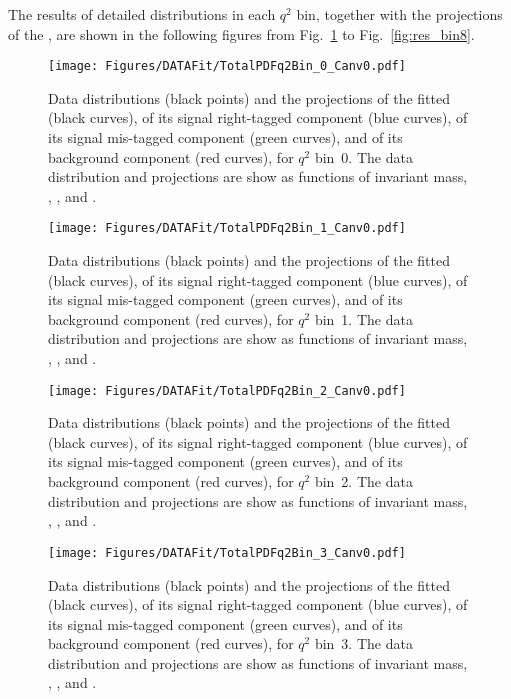 The results of detailed distributions in each $q^2$ bin, together with the projections of the \pdf, are shown in the following figures from Fig.~\ref{fig:res_bin0} to Fig.~\ref{fig:res_bin8}.

\begin{figure}
  \centering
  \texttt{[image: Figures/DATAFit/TotalPDFq2Bin\_0\_Canv0.pdf]}
  \caption{Data distributions (black points) and the projections of the fitted \pdf (black curves), of its signal right-tagged component (blue curves), of its signal mis-tagged component (green curves), and of its background component (red curves), for $q^2$ bin~0.
    The data distribution and \pdf projections are show as functions of \PBz invariant mass, \cTL, \cTK, and \PHI.}
  \label{fig:res_bin0}
\end{figure}

\begin{figure}
  \centering
  \texttt{[image: Figures/DATAFit/TotalPDFq2Bin\_1\_Canv0.pdf]}
  \caption{Data distributions (black points) and the projections of the fitted \pdf (black curves), of its signal right-tagged component (blue curves), of its signal mis-tagged component (green curves), and of its background component (red curves), for $q^2$ bin~1.
    The data distribution and \pdf projections are show as functions of \PBz invariant mass, \cTL, \cTK, and \PHI.}
  \label{fig:res_bin1}
\end{figure}


\begin{figure}
  \centering
  \texttt{[image: Figures/DATAFit/TotalPDFq2Bin\_2\_Canv0.pdf]}
  \caption{Data distributions (black points) and the projections of the fitted \pdf (black curves), of its signal right-tagged component (blue curves), of its signal mis-tagged component (green curves), and of its background component (red curves), for $q^2$ bin~2.
    The data distribution and \pdf projections are show as functions of \PBz invariant mass, \cTL, \cTK, and \PHI.}
  \label{fig:res_bin2}
\end{figure}

\begin{figure}
  \centering
  \texttt{[image: Figures/DATAFit/TotalPDFq2Bin\_3\_Canv0.pdf]}
  \caption{Data distributions (black points) and the projections of the fitted \pdf (black curves), of its signal right-tagged component (blue curves), of its signal mis-tagged component (green curves), and of its background component (red curves), for $q^2$ bin~3.
    The data distribution and \pdf projections are show as functions of \PBz invariant mass, \cTL, \cTK, and \PHI.}
  \label{fig:res_bin3}
\end{figure}

